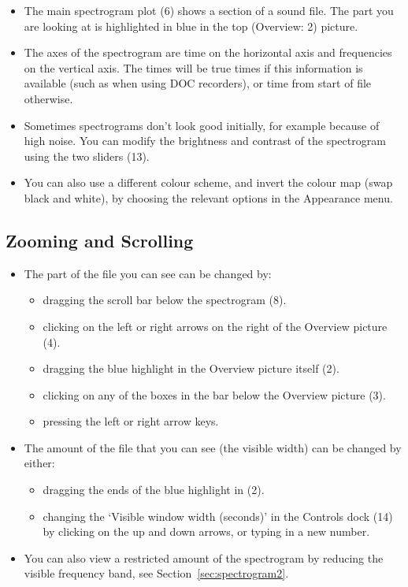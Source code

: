 \documentclass{article}
\begin{document}
\begin{itemize}
\item The main spectrogram plot (6) shows a section of a sound file. The part you are looking at is highlighted in blue in the top (Overview: 2) picture.

\item The axes of the spectrogram are time on the horizontal axis and frequencies on the vertical axis. The times will be true times if this information is available (such as when using DOC recorders), or time from start of file otherwise. 

\item Sometimes spectrograms don't look good initially, for example because of high noise. You can modify the brightness and contrast of the spectrogram using the two sliders (13). 
\item You can also use a different colour scheme, and invert the colour map (swap black and white), by choosing the relevant options in the Appearance menu.
\end{itemize}

\subsection{Zooming and Scrolling}

\begin{itemize}
\item The part of the file you can see can be changed by:
	\begin{itemize}
	\item dragging the scroll bar below the spectrogram (8).
	\item clicking on the left or right arrows on the right of the Overview picture (4).
	\item dragging the blue highlight in the Overview picture itself (2). 
	\item clicking on any of the boxes in the bar below the Overview picture (3).
	\item pressing the left or right arrow keys.
	\end{itemize}
	
\item The amount of the file that you can see (the visible width) can be changed by either: 
	\begin{itemize}
	\item dragging the ends of the blue highlight in (2).
	\item changing the `Visible window width (seconds)' in the Controls dock (14) by clicking on the up and down arrows, or typing in a new number.
	\end{itemize}

\item You can also view a restricted amount of the spectrogram by reducing the visible frequency band, see Section~\ref{sec:spectrogram2}. 
\end{itemize}
\end{document}
